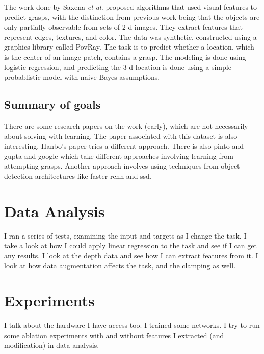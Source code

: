 \documentclass{article}
\begin{document}
The work done by Saxena \textit{et al.} \cite{saxena07,saxena08} proposed
algorithms that used visual features to predict grasps, with the distinction from
previous work being that the objects are only partially observable from sets of
2-d images. They extract features that represent edges, textures, and color.
The data was synthetic, constructed using a graphics library called PovRay.
The task is to predict whether a location, which is the center of an image patch,
contains a grasp. The modeling is done using logistic regression, and predicting
the 3-d location is done using a simple probablistic model with naive Bayes
assumptions.

\subsection{Summary of goals}
There are some research papers on the work (early), which are not necessarily
about solving with learning.
The paper associated with
this dataset is also interesting. Hanbo's paper tries a different approach.
There is also pinto and gupta and google which take different approaches
involving learning from attempting grasps. Another approach involves using
techniques from object detection architectures like faster rcnn and ssd.


\section{Data Analysis}
I ran a series of tests, examining the input and targets as I change the task.
I take a look at how I could apply linear regression to the task and see if
I can get any results. I look at the depth data and see how I can extract
features from it. I look at how data augmentation affects the task, and the
clamping as well.

\section{Experiments}
I talk about the hardware I have access too. I trained some networks. I try
to run some ablation experiments with and without features I extracted (and
modification) in data analysis.



\end{document}
